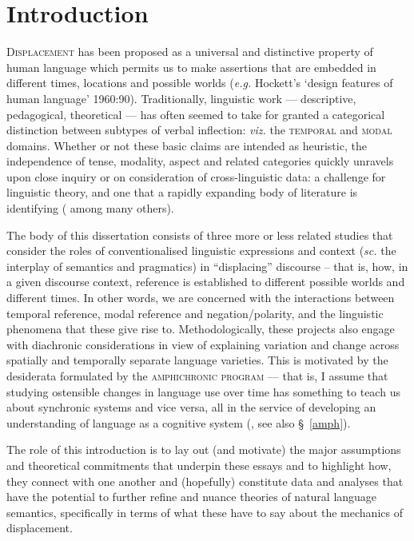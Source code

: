 \documentclass[12pt,dvipsnames]{report}
\begin{document}
\setcounter{tocdepth}{3}\tableofcontents	\gathertags
\setcounter{chapter}{0}
\setcounter{part}{0}
\reversemarginpar%
\chapter{Introduction}%
%
\label{IntroCh}
\lettrine{D}{isplacement} has been proposed as a universal and distinctive property of human language which permits us to make assertions that are embedded in different times, locations and possible worlds (\textit{e.g.} Hockett's `design features of human language' 1960:90). Traditionally, linguistic work --- descriptive, pedagogical, theoretical --- has often seemed to take for granted a categorical distinction between subtypes of verbal inflection: \textit{viz.} the \textsc{temporal} and \textsc{modal} domains. Whether or not these basic claims are intended as heuristic, the independence of tense, modality, aspect and related categories quickly unravels upon close inquiry or on consideration of cross-linguistic data: a challenge for linguistic theory, and one that a rapidly expanding body of literature is identifying  (\citealp[\textit{e.g.},][]{Condoravdi2002,Laca2012,Hacquard2006,Rullmann2018} among many others).


The body of this dissertation consists of three more or less related studies that consider the roles of conventionalised linguistic expressions and context (\textit{sc.} the interplay of semantics and pragmatics) in ``displacing'' discourse -- that is, how, in a given discourse context, reference is established to different possible worlds and different times. In other words, we are concerned with the interactions between temporal reference, modal reference and negation/polarity, and the linguistic phenomena that these give rise to. Methodologically, these projects also engage with diachronic considerations in view of explaining variation and change across spatially and temporally separate language varieties. This is motivated by the desiderata formulated by the \textsc{amphichronic program} --- that is, I assume that studying ostensible changes in language use over time has something to teach us about synchronic systems and vice versa, all in the service of developing an understanding of language as a cognitive system (\citealp[\textit{e.g.},][]{Kiparsky2006,Deo2015,Anderson2016a}, see also \S~\ref{amph}).

The role of this introduction is to lay out (and motivate) the major assumptions and theoretical commitments that underpin these essays and to highlight how, they connect with one another and (hopefully) constitute data and analyses that have the potential to further refine and nuance theories of natural language semantics, specifically in terms of what these have to say about the mechanics of displacement.
\end{document}
